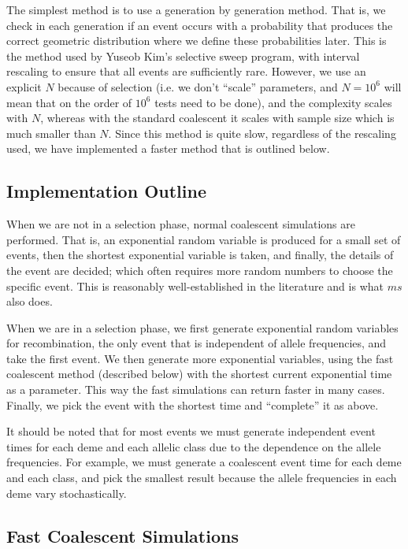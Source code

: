 \documentclass{article}
\begin{document}
The simplest method is to use a generation by generation method. That is, we
check in each generation if an event occurs with a probability that produces the
correct geometric distribution where we define these probabilities later. This is
the method used by Yuseob Kim's selective sweep program, with interval rescaling
to ensure that all events are sufficiently rare. However, we use an explicit $N$
because of selection (i.e. we don't ``scale'' parameters, and $N=10^6$ will mean
that on the order of $10^6$ tests need to be done), and the complexity scales
with $N$, whereas with the standard coalescent it scales with sample size which
is much smaller than $N$.  Since this method is quite slow, regardless of the
rescaling used, we have implemented a faster method that is outlined below.


\subsection{Implementation Outline}

When we are not in a selection phase, normal coalescent simulations are
performed. That is, an exponential random variable is produced for a small set
of events, then the shortest exponential variable is taken, and finally, the
details of the event are decided; which often requires more random numbers to
choose the specific event. This is reasonably well-established in the
literature and is what $ms$ also does.

When we are in a selection phase, we first generate exponential random variables
for recombination, the only event that is independent of allele frequencies, and
take the first event. We then generate more exponential variables, using the fast
coalescent method (described below) with the shortest current exponential time
as a parameter. This way the fast simulations can return faster in many cases. Finally, we pick the
event with the shortest time and ``complete'' it as above.

It should be noted that for most events we must generate  independent event
times for each deme and each allelic class due to the dependence on the allele
frequencies. For example, we must generate a coalescent event time for each deme
and each class, and pick the smallest result because the allele frequencies in
each deme vary stochastically.

\subsection{Fast Coalescent Simulations}
\end{document}
